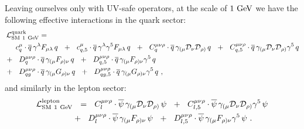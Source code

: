 \documentclass[12pt,preprintnumbers,nofootinbib]{revtex4}
\newcommand{\ov}{\overline}
\newcommand{\md}{\mathcal{D}}
\newcommand{\GeV}{{\rm GeV}}
\begin{document}
	
	Leaving ourselves only with UV-safe operators, 
	at the scale of $ 1~\GeV $ we 
	have the following effective interactions in the quark sector:
\begin{align}
\nonumber
	\mathcal{L}_{\rm SM\ 1~GeV}^{\rm quark} = \hspace{-2.0cm}&
	\\
\nonumber
	&
	\phantom{+~~}
	c_{q}^\mu \cdot
	\ov{q}\, \gamma^\lambda F_{\mu\lambda}\, q 
	~~+~~
	c_{q,5}^\mu \cdot
	\ov{q}\, \gamma^\lambda \gamma^5 F_{\mu\lambda}\, q 
	~~+~~
	C_q^{\mu\nu\rho} \cdot
	\ov{q}\, \gamma_{(\mu} \md_\nu \md_{\rho)}\, q
	~~+~~
	C_{q,5}^{\mu\nu\rho} \cdot
	\ov{q}\, \gamma_{(\mu} \md_\nu \md_{\rho)}\gamma^5\, q
	\\
\label{SM_quark_1GeV}
	&
	+~~
	D_{q}^{\mu\nu\rho} \cdot
	\ov{q}\, \gamma_{(\mu} F_{\rho)\nu}\, q
	~~+~~
	D_{q,5}^{\mu\nu\rho} \cdot
	\ov{q}\, \gamma_{(\mu} F_{\rho)\nu}\gamma^5\, q
	\\
\nonumber
	&
	+~~
	D_{qg}^{\mu\nu\rho} \cdot
	\ov{q}\, \gamma_{(\mu} G_{\rho)\nu}\, q
	~~+~~
	D_{qg,5}^{\mu\nu\rho} \cdot
	\ov{q}\, \gamma_{(\mu} G_{\rho)\nu}\gamma^5\, q
	~,
\end{align}
	and similarly in the lepton sector:
\begin{align}
\nonumber
	\mathcal{L}_{\rm SM\ 1~GeV}^{\rm lepton} & ~~=~~ %
\label{SM_lepton_1GeV}
	C_l^{\mu\nu\rho} \cdot
	\ov{\psi}\, \gamma_{(\mu} \md_\nu \md_{\rho)}\, \psi
	~~+~~
	C_{l,5}^{\mu\nu\rho} \cdot
	\ov{\psi}\, \gamma_{(\mu} \md_\nu \md_{\rho)}\gamma^5\, \psi
	\\
\notag
	&
	+~~
	D_{l}^{\mu\nu\rho} \cdot
	\ov{\psi}\, \gamma_{(\mu} F_{\rho)\nu}\, \psi
	~~+~~
	D_{l,5}^{\mu\nu\rho} \cdot
	\ov{\psi}\, \gamma_{(\mu} F_{\rho)\nu}\gamma^5\, \psi
	~.
\end{align}
\end{document}
